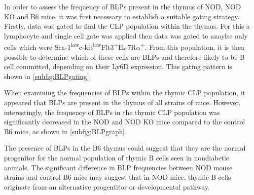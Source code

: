 




In order to assess the frequency of BLPs present in the thymus of NOD, NOD KO and B6 mice, it was first necessary to establish a suitable gating strategy.
Firstly, data was gated to find the CLP population within the thymus.
For this a lymphocyte and single cell gate was applied then data was gated to anaylse only cells which were Sca-1\textsuperscript{low}c-kit\textsuperscript{low}Flt3\textsuperscript{+}IL-7R$\alpha$\textsuperscript{+}.
From this population, it is then possible to determine which of these cells are BLPs and therefore likely to be B cell committed, depending on their Ly6D expression.
This gating pattern is shown in \cref{subfig:BLPgating}.

When examining the frequencies of BLPs within the thymic CLP population, it appeared that BLPs are present in the thymus of all strains of mice.
However, interestingly, the frequency of BLPs in the thymic CLP population was significantly decreased in the NOD and NOD KO mice compared to the control B6 mice, as shown in \cref{subfig:BLPgraph}.

The presence of BLPs in the B6 thymus could suggest that they are the normal progenitor for the normal population of thymic B cells seen in nondiabetic animals.
The significant difference in BLP frequencies between NOD mouse strains and control B6 mice may suggest that in NOD mice, thymic B cells originate from an alternative progentitor or developmental pathway.


